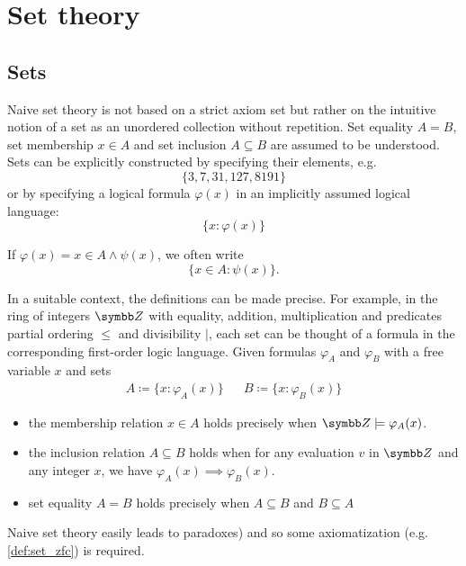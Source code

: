 \section{Set theory}\label{sec:set_theory}
\subsection{Sets}\label{subsec:sets}

\begin{definition}\label{def:set_naive}\cite[chapter 1]{Enderton1977}
  Naive set theory is not based on a strict axiom set but rather on the intuitive notion of a set as an unordered collection without repetition. Set equality \( A = B \), set membership \( x \in A \) and set inclusion \( A \subseteq B \) are assumed to be understood. Sets can be explicitly constructed by specifying their elements, e.g.
  \begin{equation*}
    \{ 3, 7, 31, 127, 8191 \}
  \end{equation*}
  or by specifying a logical formula \( \varphi(x) \) in an implicitly assumed logical language:
  \begin{equation*}
    \{ x \colon \varphi(x) \}
  \end{equation*}

  If \( \varphi(x) = x \in A \land \psi(x) \), we often write
  \begin{equation*}
    \{ x \in A \colon \psi(x) \}.
  \end{equation*}

  In a suitable context, the definitions can be made precise. For example, in the ring of integers \( \Z \) with equality, addition, multiplication and predicates partial ordering \( \leq \) and divisibility \( \vert \), each set can be thought of a formula in the corresponding first-order logic language. Given formulas \( \varphi_A \) and \( \varphi_B \) with a free variable \( x \) and sets
  \begin{align*}
    A \coloneqq \{ x \colon \varphi_A(x) \} && B \coloneqq \{ x \colon \varphi_B(x) \}
  \end{align*}

  \begin{itemize}
    \item the membership relation \( x \in A \) holds precisely when \( \Z \models \varphi_A(x) \).

    \item the inclusion relation \( A \subseteq B \) holds when for any evaluation \( v \) in \( \Z \) and any integer \( x \), we have \( \varphi_A(x) \implies \varphi_B(x) \).

    \item set equality \( A = B \) holds precisely when \( A \subseteq B \) and \( B \subseteq A \)
  \end{itemize}

  Naive set theory easily leads to paradoxes) and so some axiomatization (e.g. \cref{def:set_zfc}) is required.
\end{definition}

